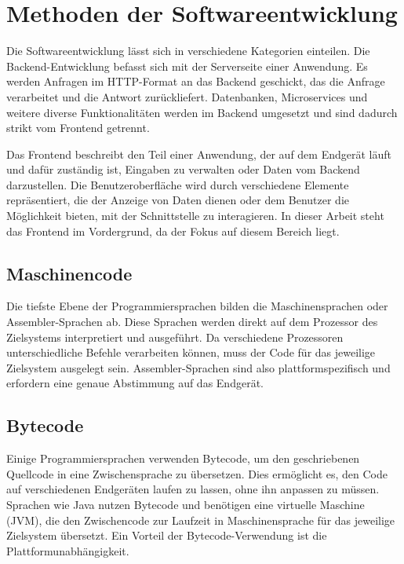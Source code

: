 \section{Methoden der Softwareentwicklung}
Die Softwareentwicklung lässt sich in verschiedene Kategorien einteilen. Die Backend-Entwicklung befasst sich mit der Serverseite einer Anwendung. Es werden Anfragen im HTTP-Format an das Backend geschickt, das die Anfrage verarbeitet und die Antwort zurückliefert. Datenbanken, Microservices und weitere diverse Funktionalitäten werden im Backend umgesetzt und sind dadurch strikt vom Frontend getrennt.

\vspace{0.5cm}

Das Frontend beschreibt den Teil einer Anwendung, der auf dem Endgerät läuft und dafür zuständig ist, Eingaben zu verwalten oder Daten vom Backend darzustellen. Die Benutzeroberfläche wird durch verschiedene Elemente repräsentiert, die der Anzeige von Daten dienen oder dem Benutzer die Möglichkeit bieten, mit der Schnittstelle zu interagieren. In dieser Arbeit steht das Frontend im Vordergrund, da der Fokus auf diesem Bereich liegt.

\vspace{0.5cm}

\subsection{Maschinencode}

Die tiefste Ebene der Programmiersprachen bilden die Maschinensprachen oder Assembler-Sprachen ab. Diese Sprachen werden direkt auf dem Prozessor des Zielsystems interpretiert und ausgeführt. Da verschiedene Prozessoren unterschiedliche Befehle verarbeiten können, muss der Code für das jeweilige Zielsystem ausgelegt sein. Assembler-Sprachen sind also plattformspezifisch und erfordern eine genaue Abstimmung auf das Endgerät.

\vspace{0.5cm}

\subsection{Bytecode}

Einige Programmiersprachen verwenden Bytecode, um den geschriebenen Quellcode in eine Zwischensprache zu übersetzen. Dies ermöglicht es, den Code auf verschiedenen Endgeräten laufen zu lassen, ohne ihn anpassen zu müssen. Sprachen wie Java nutzen Bytecode und benötigen eine virtuelle Maschine (JVM), die den Zwischencode zur Laufzeit in Maschinensprache für das jeweilige Zielsystem übersetzt. Ein Vorteil der Bytecode-Verwendung ist die Plattformunabhängigkeit.

